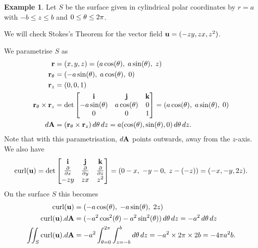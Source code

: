 \documentclass[reqno]{amsart}
\theoremstyle{definition}
\newtheorem{example}[theorem]{Example}
\begin{document}
\begin{example}
 Let $S$ be the surface given in cylindrical polar coordinates by
 $r=a$ with $-b\leq z\leq b$ and $0\leq\theta\leq 2\pi$.
 \begin{center}
 \end{center}
 We will check Stokes's Theorem for the vector field
 $\mathbf{u}=(-zy,zx,z^2)$.

 We parametrise $S$ as 
 \begin{align*}
  \mathbf{r} &= (x,y,z) = (a\cos(\theta),\;a\sin(\theta),\;z) \\
  \mathbf{r}_{\theta} &= (-a\sin(\theta),\;a\cos(\theta),\;0) \\
  \mathbf{r}_z &= (0,0,1) \\
  \mathbf{r}_\theta\times\mathbf{r}_z &= 
   \det\left[\begin{matrix} \mathbf{i}          & \mathbf{j}         & \mathbf{k} \\ 
            -a\sin(\theta) & a\cos(\theta) & 0 \\
            0            & 0           & 1 \end{matrix}\right] = 
    (a\cos(\theta),\;a\sin(\theta),\;0) \\
  d\mathbf{A} &= (\mathbf{r}_\theta\times\mathbf{r}_z)\,d\theta\,dz
        = a(\cos(\theta),\sin(\theta),0)\,d\theta\,dz.
 \end{align*}
 Note that with this parametrisation, $d\mathbf{A}$ points outwards, away
 from the $z$-axis.  We also have
 \[ \operatorname{curl}(\mathbf{u}) =
     \det\left[\begin{matrix} \mathbf{i}  & \mathbf{j}  & \mathbf{k}  \\
              \frac{\partial}{\partial x} & \frac{\partial}{\partial y} & \frac{\partial}{\partial z} \\
              -zy  & zx   & z^2 \end{matrix}\right]  
     = (0-x,\;-y-0,\;z-(-z)) = (-x,-y,2z).
 \]
 On the surface $S$ this becomes
 \begin{align*}
  \operatorname{curl}(\mathbf{u}) &= (-a\cos(\theta),\;-a\sin(\theta),\;2z) \\
  \operatorname{curl}(\mathbf{u}).d\mathbf{A} &= (-a^2\cos^2(\theta)-a^2\sin^2(\theta))\,d\theta\,dz 
   = -a^2\,d\theta\,dz \\
  \iint_S \operatorname{curl}(\mathbf{u}).d\mathbf{A}
    &= -a^2\int_{\theta=0}^{2\pi} \int_{z=-b}^b d\theta\,dz 
     = -a^2\times 2\pi \times 2b = -4\pi a^2b.
 \end{align*}


\end{example}
\end{document}
